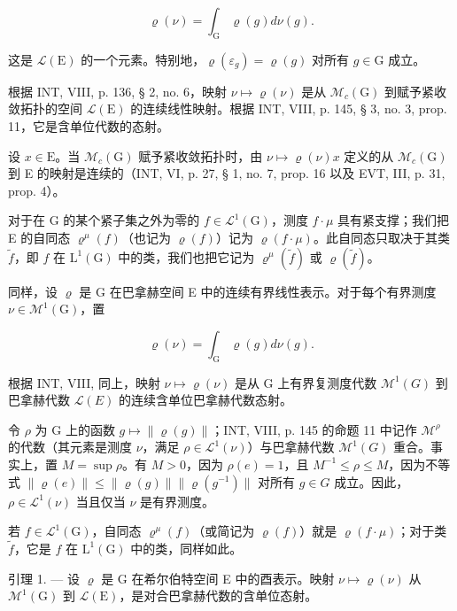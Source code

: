 \[
\varrho (\nu) = \int_ {\mathrm{G}} \varrho (g) d \nu (g).
\]

这是 \(\mathcal{L}(\mathrm{E})\) 的一个元素。特别地，\(\varrho(\varepsilon_g) = \varrho(g)\) 对所有 \(g \in \mathrm{G}\) 成立。

根据 INT, VIII, p. 136, § 2, no. 6，映射 \(\nu \mapsto \varrho(\nu)\) 是从 \(\mathcal{M}_c(\mathrm{G})\) 到赋予紧收敛拓扑的空间 \(\mathcal{L}(\mathrm{E})\) 的连续线性映射。根据 INT, VIII, p. 145, § 3, no. 3, prop. 11，它是含单位代数的态射。

设 \(x \in \mathrm{E}\)。当 \(\mathcal{M}_c(\mathrm{G})\) 赋予紧收敛拓扑时，由 \(\nu \mapsto \varrho(\nu)x\) 定义的从 \(\mathcal{M}_c(\mathrm{G})\) 到 E 的映射是连续的（INT, VI, p. 27, § 1, no. 7, prop. 16 以及 EVT, III, p. 31, prop. 4）。

对于在 G 的某个紧子集之外为零的 \(f \in \mathcal{L}^{1}(\mathrm{G})\)，测度 \(f \cdot \mu\) 具有紧支撑；我们把 E 的自同态 \(\varrho^{\mu}(f)\)（也记为 \(\varrho(f)\)）记为 \(\varrho(f \cdot \mu)\)。此自同态只取决于其类 \(\widetilde{f}\)，即 \(f\) 在 \(\mathrm{L}^{1}(\mathrm{G})\) 中的类，我们也把它记为 \(\varrho^{\mu}(\widetilde{f})\) 或 \(\varrho(\widetilde{f})\)。

同样，设 \(\varrho\) 是 G 在巴拿赫空间 E 中的连续有界线性表示。对于每个有界测度 \(\nu \in \mathcal{M}^{1}(\mathrm{G})\)，置

\[
\varrho (\nu) = \int_ {\mathrm{G}} \varrho (g) d \nu (g).
\]

根据 INT, VIII, 同上，映射 \(\nu \mapsto \varrho(\nu)\) 是从 G 上有界复测度代数 \(\mathcal{M}^{1}(G)\) 到巴拿赫代数 \(\mathcal{L}(E)\) 的连续含单位巴拿赫代数态射。

令 \(\rho\) 为 G 上的函数 \(g\mapsto\|\varrho(g)\|\)；INT, VIII, p. 145 的命题 11 中记作 \(\mathcal{M}^{\rho}\) 的代数（其元素是测度 \(\nu\)，满足 \(\rho\in\mathcal{L}^{1}(\nu)\)）与巴拿赫代数 \(\mathcal{M}^{1}(G)\) 重合。事实上，置 \(M = \sup \rho\)。有 \(M > 0\)，因为 \(\rho(e)=1\)，且 \(M^{-1} \leqslant \rho \leqslant M\)，因为不等式 \(\|\varrho(e)\|\leqslant\|\varrho(g)\|\|\varrho(g^{-1})\|\) 对所有 \(g\in G\) 成立。因此，\(\rho\in\mathcal{L}^{1}(\nu)\) 当且仅当 \(\nu\) 是有界测度。

若 \(f \in \mathcal{L}^{1}(\mathrm{G})\)，自同态 \(\varrho^{\mu}(f)\)（或简记为 \(\varrho(f)\)）就是 \(\varrho(f \cdot \mu)\)；对于类 \(\tilde{f}\)，它是 \(f\) 在 \(\mathrm{L}^{1}(\mathrm{G})\) 中的类，同样如此。

引理 1. --- 设 \(\varrho\) 是 G 在希尔伯特空间 E 中的酉表示。映射 \(\nu \mapsto \varrho(\nu)\) 从 \(\mathcal{M}^{1}(\mathrm{G})\) 到 \(\mathcal{L}(\mathrm{E})\)，是对合巴拿赫代数的含单位态射。

